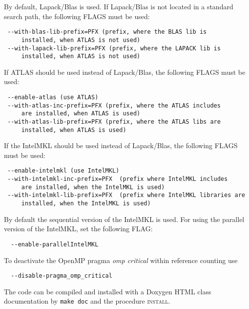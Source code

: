 By default, Lapack/Blas is used. If Lapack/Blas is not located in a standard search path, the following FLAGS must be used:
\begin{verbatim}
 --with-blas-lib-prefix=PFX (prefix, where the BLAS lib is
     installed, when ATLAS is not used)
 --with-lapack-lib-prefix=PFX (prefix, where the LAPACK lib is
     installed, when ATLAS is not used)
\end{verbatim}

If ATLAS should be used instead of Lapack/Blas, the following FLAGS must be used:
\begin{verbatim}
 --enable-atlas (use ATLAS)
 --with-atlas-inc-prefix=PFX (prefix, where the ATLAS includes 
     are installed, when ATLAS is used)
 --with-atlas-lib-prefix=PFX (prefix, where the ATLAS libs are
     installed, when ATLAS is used)
\end{verbatim}

If the IntelMKL should be used instead of Lapack/Blas, the following FLAGS must be used:
\begin{verbatim}
 --enable-intelmkl (use IntelMKL)
 --with-intelmkl-inc-prefix=PFX  (prefix where IntelMKL includes
     are installed, when the IntelMKL is used)
 --with-intelmkl-lib-prefix=PFX  (prefix where IntelMKL libraries are
     installed, when the IntelMKL is used)
\end{verbatim}

By default the sequential version of the IntelMKL is used. For using the parallel version of the IntelMKL, set the following FLAG:
\begin{verbatim}
  --enable-parallelIntelMKL
\end{verbatim}

To deactivate the OpenMP pragma \textit{omp critical} within reference counting use
\begin{verbatim}
  --disable-pragma_omp_critical
\end{verbatim}
The code can be compiled and installed with a Doxygen HTML class documentation by \texttt{make doc} and the procedure \textsc{install}.

